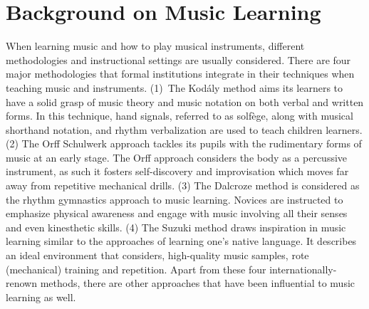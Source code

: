 \documentclass[sigchi, review]{acmart}
\begin{document}


\section{Background on Music Learning}
When learning music and how to play musical instruments, different methodologies and instructional settings are usually considered. There are four major methodologies that formal institutions integrate in their techniques when teaching music and instruments. %
(1)~The Kodály method \cite{choksy1974kodaly} aims its learners to have a solid grasp of music theory and music notation on both verbal and written forms. In this technique, hand signals, referred to as solfège, along with musical shorthand notation, and rhythm verbalization are used to teach children learners. (2) The Orff Schulwerk \cite{shamrock1997orff} approach tackles its pupils with the rudimentary forms of music at an early stage. The Orff approach considers the body as a percussive instrument, as such it fosters self-discovery and improvisation which moves far away from repetitive mechanical drills. (3) The Dalcroze method \cite{mead1994dalcroze} is considered as the rhythm gymnastics approach to music learning. Novices are instructed to emphasize physical awareness and engage with music involving all their senses and even kinesthetic skills. (4) The Suzuki method \cite{peak1998suzuki} draws inspiration in music learning similar to the approaches of learning one's native language. It describes an ideal environment that considers, high-quality music samples, rote (mechanical) training and repetition. Apart from these four internationally-renown methods, there are other approaches that have been influential to music learning as well. 
\end{document}
